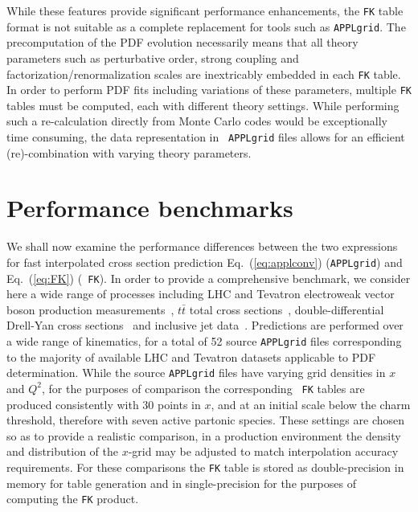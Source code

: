 \documentclass[preprint,12pt]{elsarticle}
\begin{document}
While these features provide significant performance enhancements, the
{\tt FK} table format is not suitable as a complete replacement for
tools such as {\tt APPLgrid}. The precomputation of the PDF evolution
necessarily means that all theory parameters such as perturbative
order, strong coupling and factorization/renormalization scales are
inextricably embedded in each {\tt FK} table. In order to perform PDF
fits including variations of these parameters, multiple {\tt FK}
tables must be computed, each with different theory settings. While
performing such a re-calculation directly from Monte Carlo codes would
be exceptionally time consuming, the data representation in {\tt
  APPLgrid} files allows for an efficient (re)-combination with varying
theory parameters.

\section{Performance benchmarks}
\label{sec:benchmark}

We shall now examine the performance differences between
the two expressions for fast interpolated cross section prediction
Eq.~(\ref{eq:applconv}) ({\tt APPLgrid}) and Eq.~(\ref{eq:FK}) ({\tt
  FK}).
%
In order to provide a comprehensive benchmark, we consider here a wide range of
processes including LHC and Tevatron electroweak vector boson
production
measurements~\cite{Aaij:2012mda,Aaij:2012vn,Chatrchyan:2013mza,Chatrchyan:2013uja,Chatrchyan:2012xt,Aad:2013iua,Aad:2011fp,Aad:2011dm,Aaltonen:2010zza},
$t\bar{t}$ total
cross sections~\cite{ATLAS:2012aa, Chatrchyan:2013faa,Chatrchyan:2012bra,Chatrchyan:2012ria},
double-differential Drell-Yan
cross sections~\cite{Chatrchyan:2013tia,CMS:2014jea} and inclusive jet
data~\cite{Chatrchyan:2012bja,Aad:2011fc,Aad:2013lpa,Abazov:2007jy}. Predictions
are performed over a wide range of kinematics, for a total of 52
source {\tt APPLgrid} files corresponding to the majority of available
LHC and Tevatron datasets applicable to PDF determination.
While the source {\tt APPLgrid} files have varying grid densities in
$x$ and $Q^2$, for the purposes of comparison the corresponding {\tt
  FK} tables are produced consistently with 30 points in $x$, and at
an initial scale below the charm threshold, therefore with seven
active partonic species. These settings are chosen so as to provide a realistic
comparison, in a production environment the density and distribution of the
$x$-grid may be adjusted to match interpolation accuracy requirements.  For these comparisons the {\tt FK}
table is stored as double-precision in memory for table generation and in
single-precision for the purposes of computing the {\tt FK} product.
\end{document}
